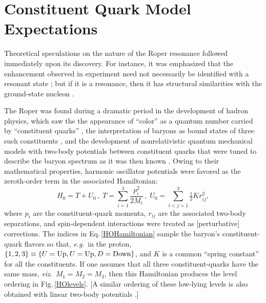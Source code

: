 \section{Constituent Quark Model Expectations}
%
Theoretical speculations on the nature of the Roper resonance followed immediately upon its discovery.  For instance, it was emphasized that the enhancement observed in experiment need not necessarily be identified with a resonant state \cite{DALITZ1965159}; but if it is a resonance, then it has structural similarities with the ground-state nucleon \cite{PhysRevLett.16.772}.

The Roper was found during a dramatic period in the development of hadron physics, which saw the
the appearance of ``color'' as a quantum number carried by ``constituent quarks'' \cite{Greenberg:1964pe}, the interpretation of baryons as bound states of three such constituents \cite{GellMann:1964nj, Zweig:1981pd}, and the development of nonrelativistic quantum mechanical models with two-body potentials between constituent quarks that were tuned to describe the baryon spectrum as it was then known \cite{Hey:1982aj}.  Owing to their mathematical properties, harmonic oscillator potentials were favored as the zeroth-order term in the associated Hamiltonian:
\begin{equation}
\label{HOHamiltonian}
H_0=T + U_0\,, \; T = \sum_{i=1}^3 \frac{p_i^2}{2 M_i} \,, \;
U_0 = \sum_{i<j=1}^3 \tfrac{1}{2} K r_{ij}^2,
\end{equation}
where $p_i$ are the constituent-quark momenta, $r_{ij}$ are the associated two-body separations, and spin-dependent interactions were treated as [perturbative] corrections.  The indices in Eq.\,\eqref{HOHamiltonian} sample the baryon's constituent-quark flavors so that, \emph{e.g}.\ in the proton, $\{1,2,3\}\equiv\{U={\rm Up},U={\rm Up},D={\rm Down}\}$, and $K$ is a common ``spring constant'' for all the constituents.  If one assumes that all three constituent-quarks have the same mass, \emph{viz}.\ $M_1=M_2=M_3$, then this Hamiltonian produces the level ordering in Fig.\,\ref{HOlevels}.  [A similar ordering of these low-lying levels is also obtained with linear two-body potentials \cite{Richard:1992uk}.]

